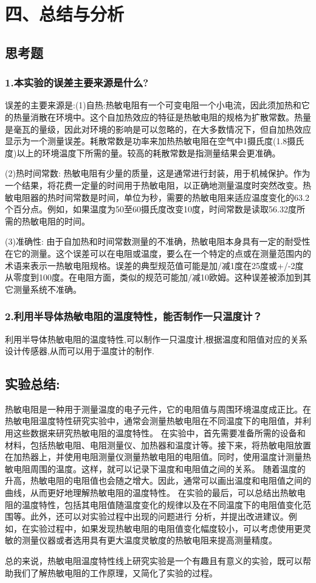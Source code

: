 \documentclass{article}
\begin{document}
\section*{四、总结与分析}

\subsection*{思考题}

\subsubsection*{1.本实验的误差主要来源是什么?}
误差的主要来源是:(1)自热:热敏电阻有一个可变电阻一个小电流，因此须加热和它的热量消散在环境中。这个自加热效应的特征是热敏电阻的规格为扩散常数。热量是毫瓦的量级，因此对环境的影响是可以忽略的，在大多数情况下，但自加热效应显示为一个测量误差。耗散常数是功率来加热热敏电阻在空气中1摄氏度(1.8摄氏度)以上的环境温度下所需的量。较高的耗散常数是指测量结果会更准确。

(2)热时间常数:
热敏电阻有少量的质量，这是通常进行封装，用于机械保护。作为一个结果，将花费一定量的时间用于热敏电阻，以正确地测量温度时突然改变。热敏电阻器的热时间常数是时间，单位为秒，需要的热敏电阻来适应温度变化的63.2个百分点。例如，如果温度为50至60摄氏度改变10度，时间常数是读取56.32度所需的热敏电阻的时间。

(3)准确性:
由于自加热和时间常数测量的不准确，热敏电阻本身具有一定的耐受性在它的测量。这个误差可以在电阻或温度，要么在一个特定的点或在测量范围内的术语来表示一热敏电阻规格。误差的典型规范值可能是加/减1度在25度或+/-2度从零度到100度。在电阻方面，类似的规范可能加/减10欧姆。这种误差被添加到其它测量系统不准确。


\subsubsection*{2.利用半导体热敏电阻的温度特性，能否制作一只温度计？}
利用半导体热敏电阻的温度特性,可以制作一只温度计,根据温度和阻值对应的关系设计传感器,从而可以用于温度计的制作.


\subsection*{实验总结:}
热敏电阻是一种用于测量温度的电子元件，它的电阻值与周围环境温度成正比。在热敏电阻温度特性研究实验中，通常会测量热敏电阻在不同温度下的电阻值，并利用这些数据来研究热敏电阻的温度特性。
在实验中，首先需要准备所需的设备和材料，包括热敏电阻、电阻测量仪、加热器和温度计等。接下来，将热敏电阻放置在加热器上，并使用电阻测量仪测量热敏电阻的电阻值。同时，使用温度计测量热敏电阻周围的温度。这样，就可以记录下温度和电阻值之间的关系。
随着温度的升高，热敏电阻的电阻值也会随之增大。因此，通常可以画出温度和电阻值之间的曲线，从而更好地理解热敏电阻的温度特性。
在实验的最后，可以总结出热敏电阻的温度特性，包括其电阻值随温度变化的规律以及在不同温度下的电阻值变化范围等。此外，还可以对实验过程中出现的问题进行
分析，并提出改进建议。例如，在实验过程中，如果发现热敏电阻的电阻值变化幅度较小，可以考虑使用更灵敏的测量仪器或者选用具有更大温度灵敏度的热敏电阻来提高测量精度。

总的来说，热敏电阻温度特性线上研究实验是一个有趣且有意义的实验，既可以帮助我们了解热敏电阻的工作原理，又简化了实验的过程。
\end{document}
